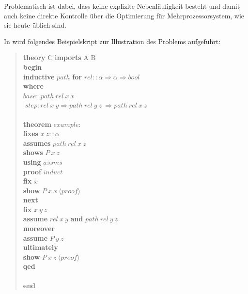 Problematisch ist dabei, dass keine explizite Nebenläufigkeit besteht und damit auch keine direkte
Kontrolle über die Optimierung für Mehrprozessorsystem, wie sie heute üblich sind.

\clearpage

In \cite{parproof} wird folgendes Beispielskript zur Illustration des Problems aufgeführt:

\begin{quote}
\textbf{theory} C \textbf{imports} A B\\
\textbf{begin}\\
\textbf{inductive} $path$ \textbf{for} $rel :: \alpha \Rightarrow \alpha \Rightarrow bool$\\
\textbf{where}\\
\hspace*{7 mm}$base:\ path\ rel\ x\ x$\\
$|$\hspace*{6 mm}$step: rel\ x\ y \Longrightarrow path\ rel\ y\ z\ \Longrightarrow path\ rel\ x\ z$\\
\\
\textbf{theorem} $example:$\\
\hspace*{7 mm}\textbf{ﬁxes} $x\ z :: \alpha$\\
\hspace*{7 mm}\textbf{assumes} $path\ rel\ x\ z$\\
\hspace*{7 mm}\textbf{shows} $P\ x\ z$\\
\textbf{using} $assms$\\
\textbf{proof} $induct$\\
\hspace*{7 mm}\textbf{ﬁx} $x$\\
\hspace*{7 mm}\textbf{show} $P\ x\ x\ \langle proof\rangle$\\
\textbf{next}\\
\hspace*{7 mm}\textbf{ﬁx} $x\ y\ z$\\
\hspace*{7 mm}\textbf{assume} $rel\ x\ y$ \textbf{and} $path\ rel\ y\ z$\\
\hspace*{7 mm}\textbf{moreover}\\
\hspace*{7 mm}\textbf{assume} $P\ y\ z$\\
\hspace*{7 mm}\textbf{ultimately}\\
\hspace*{7 mm}\textbf{show} $P\ x\ z\ \langle proof\rangle$\\
\textbf{qed}\\
\\
\textbf{end}
\end{quote}

